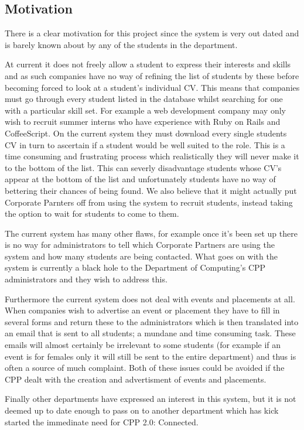 \subsection{Motivation}
  There is a clear motivation for this project since the system is very out dated and is barely known about by any of the students in the department.
  
  At current it does not freely allow a student to express their interests and skills and as such companies have no way of refining the list of students by these before becoming forced to look at a student's individual CV. This means that companies must go through every student listed in the database whilst searching for one with a particular skill set. For example a web development company may only wish to recruit summer interns who have experience with Ruby on Rails and CoffeeScript. On the current system they must download every single students CV in turn to ascertain if a student would be well suited to the role. This is a time consuming and frustrating process which realistically they will never make it to the bottom of the list. This can severly disadvantage students whose CV's appear at the bottom of the list and unfortunately students have no way of bettering their chances of being found.
  We also believe that it might actually put Corporate Parnters off from using the system to recruit students, instead taking the option to wait for students to come to them.

  The current system has many other flaws, for example once it's been set up there is no way for administrators to tell which Corporate Partners are using the system and how many students are being contacted. What goes on with the system is currently a black hole to the Department of Computing's CPP administrators and they wish to address this. 

  Furthermore the current system does not deal with events and placements at all. When companies wish to advertise an event or placement they have to fill in several forms and return these to the administrators which is then translated into an email that is sent to all students; a mundane and time consuming task. These emails will almost certainly be irrelevant to some students (for example if an event is for females only it will still be sent to the entire department) and thus is often a source of much complaint. 
  Both of these issues could be avoided if the CPP dealt with the creation and advertisment of events and placements.

  Finally other departments have expressed an interest in this system, but it is not deemed up to date enough to pass on to another department which has kick started the immedinate need for CPP 2.0: Connected.
